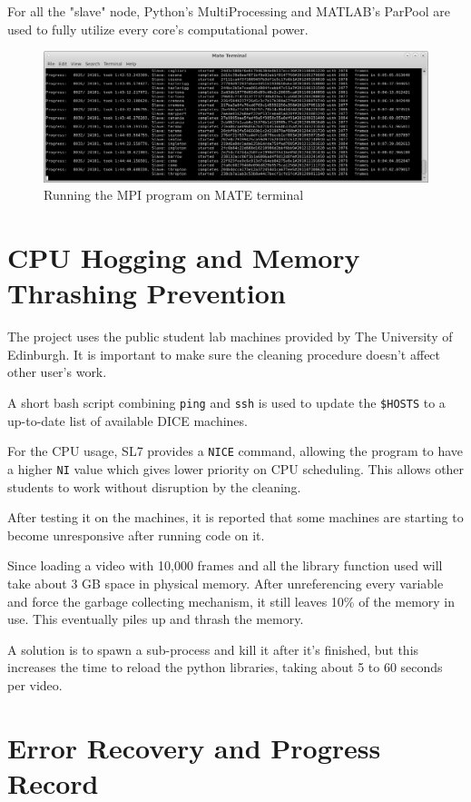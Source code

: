 \documentclass[bsc,logo,twoside,fullspacing,parskip]{infthesis}
\begin{document}
For all the "slave" node, Python's MultiProcessing and MATLAB's ParPool are used to fully utilize every core's computational power.

\begin{figure}
    \centering
    \includegraphics[scale=0.30]{graph/sample_terminal.png}
    \caption{Running the MPI program on MATE terminal}
    \label{fig:mpi}
\end{figure}

\section{CPU Hogging and Memory Thrashing Prevention}

The project uses the public student lab machines provided by The University of Edinburgh. 
It is important to make sure the cleaning procedure doesn't affect other user's work.

A short bash script combining {\tt ping} and {\tt ssh} is used to update the {\tt \$HOSTS} to a up-to-date list of available DICE machines.

For the CPU usage, SL7 provides a {\tt NICE} command, allowing the program to have a higher {\tt NI} value which gives lower priority on CPU scheduling. This allows other students to work without disruption by the cleaning.

After testing it on the machines, it is reported that some machines are starting to become unresponsive after running code on it.

Since loading a video with 10,000 frames and all the library function used will take about 3 GB space in physical memory. 
After unreferencing every variable and force the garbage collecting mechanism, it still leaves 10\% of the memory in use. This eventually piles up and thrash the memory. 

A solution is to spawn a sub-process and kill it after it's finished, but this increases the time to reload the python libraries, taking about 5 to 60 seconds per video.

\section{Error Recovery and Progress Record}
\end{document}
